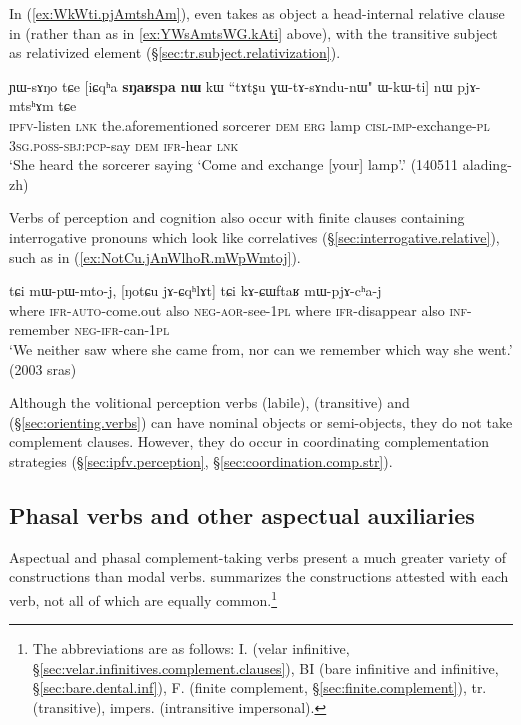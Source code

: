  In   (\ref{ex:WkWti.pjAmtshAm}),  even takes as object a head-internal relative clause in  (rather than  as in \ref{ex:YWsAmtsWG.kAti} above), with the transitive subject as relativized element (§\ref{sec:tr.subject.relativization}).
 
\begin{exe}
\ex \label{ex:WkWti.pjAmtshAm}
 \gll  ɲɯ-sɤŋo tɕe [iɕqʰa \textbf{sŋaʁspa} \textbf{nɯ} kɯ ``tɤtʂu ɣɯ-tɤ-sɤndu-nɯ" ɯ-kɯ-ti] nɯ pjɤ-mtsʰɤm tɕe \\
 \textsc{ipfv}-listen \textsc{lnk} the.aforementioned sorcerer \textsc{dem} \textsc{erg} lamp \textsc{cisl}-\textsc{imp}-exchange-\textsc{pl} \textsc{3sg}.\textsc{poss}-\textsc{sbj}:\textsc{pcp}-say \textsc{dem} \textsc{ifr}-hear \textsc{lnk} \\
 \glt `She heard the sorcerer saying `Come and exchange [your] lamp'.' (140511 alading-zh)
 \end{exe}

Verbs of perception and cognition also occur with finite clauses containing interrogative pronouns which look like correlatives (§\ref{sec:interrogative.relative}), such as  in (\ref{ex:NotCu.jAnWlhoR.mWpWmtoj}).

\begin{exe}
\ex \label{ex:NotCu.jAnWlhoR.mWpWmtoj}
  tɕi mɯ-pɯ-mto-j, [ŋotɕu jɤ-ɕqʰlɤt] tɕi kɤ-ɕɯftaʁ mɯ-pjɤ-cʰa-j \\
where \textsc{ifr}-\textsc{auto}-come.out also \textsc{neg}-\textsc{aor}-see-\textsc{1pl} where \textsc{ifr}-disappear also \textsc{inf}-remember \textsc{neg}-\textsc{ifr}-can-\textsc{1pl} \\
\glt `We neither saw where she came from, nor can we remember which way she went.' (2003 sras)
\end{exe}
 
Although the volitional perception verbs   (labile),  (transitive) and  (§\ref{sec:orienting.verbs}) can have nominal objects or semi-objects, they do not take complement clauses. However, they do occur in coordinating complementation strategies (§\ref{sec:ipfv.perception}, §\ref{sec:coordination.comp.str}).
 

  \subsection{Phasal verbs and other aspectual auxiliaries} \label{sec:aspectual.complement}
Aspectual and phasal com\-ple\-ment-taking verbs present a  much greater variety of constructions than modal verbs.  summarizes the constructions attested with each verb, not all of which are equally common.\footnote{The abbreviations are as follows: 	I. (velar infinitive, §\ref{sec:velar.infinitives.complement.clauses}), BI (bare infinitive and  infinitive, §\ref{sec:bare.dental.inf}), 	F. (finite complement, §\ref{sec:finite.complement}), tr. (transitive), impers. (intransitive impersonal). }  
  

